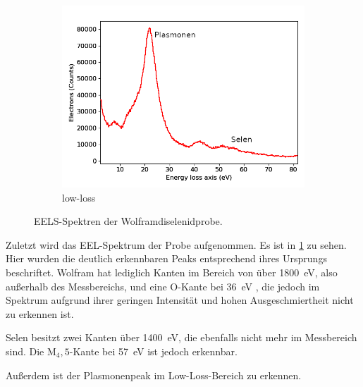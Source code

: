 \begin{figure}[H]
\begin{subfigure}[b]{0.7\textwidth}
				\includegraphics[width= 1 \linewidth]{img/tem_mark}
				\caption{low-loss}
	\end{subfigure}
		\caption{
      EELS-Spektren der Wolframdiselenidprobe.
			}
    \label{fig:eels}
	\end{figure}

  Zuletzt wird das EEL-Spektrum der Probe aufgenommen.
  Es ist in \cref{fig:eels} zu sehen.
  Hier wurden die deutlich erkennbaren Peaks entsprechend ihres Ursprungs beschriftet.
  Wolfram hat lediglich Kanten im Bereich von über \SI{1800}{eV}, also außerhalb des Messbereichs, und eine O-Kante bei \SI{36}{eV} \cite{eelsinfo}, die jedoch im Spektrum aufgrund ihrer geringen Intensität und hohen Ausgeschmiertheit nicht zu erkennen ist.

  Selen besitzt zwei Kanten über \SI{1400}{eV}, die ebenfalls nicht mehr im Messbereich sind.
  Die M$_4,5$-Kante bei \SI{57}{eV} ist jedoch erkennbar.

  Außerdem ist der Plasmonenpeak im Low-Loss-Bereich zu erkennen.


